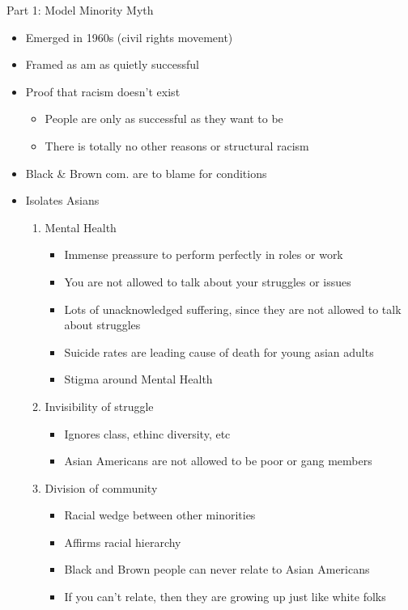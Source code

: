 \documentclass{article}
\begin{document}
Part 1: Model Minority Myth
\begin{itemize}
  \item Emerged in 1960s (civil rights movement)
  \item Framed as am as quietly successful
  \item Proof that racism doesn't exist
    \begin{itemize}
      \item People are only as successful as they want to be
      \item There is totally no other reasons or structural
        racism
    \end{itemize}
  \item Black \& Brown com. are to blame for conditions
  \item Isolates Asians
    \begin{enumerate}
      \item Mental Health
        \begin{itemize}
          \item Immense preassure to perform perfectly
            in roles or work
          \item You are not allowed to talk about your
            struggles or issues
          \item Lots of unacknowledged suffering,
            since they are not allowed to talk about struggles
          \item Suicide rates are leading cause of death
            for young asian adults
          \item Stigma around Mental Health
        \end{itemize}
      \item Invisibility of struggle
        \begin{itemize}
          \item Ignores class, ethinc diversity, etc
          \item Asian Americans are not allowed
            to be poor or gang members
        \end{itemize}
      \item Division of community
        \begin{itemize}
          \item Racial wedge between other minorities
          \item Affirms racial hierarchy
          \item Black and Brown people can never relate to Asian Americans
          \item If you can't relate, then they are growing up just like
            white folks


\end{itemize}
\end{enumerate}
\end{itemize}
\end{document}
